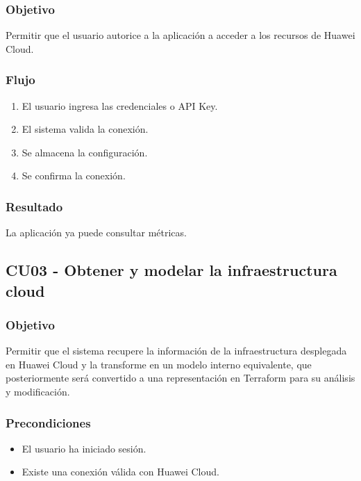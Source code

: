 \subsubsection*{Objetivo}

Permitir que el usuario autorice a la aplicación a acceder a los recursos de Huawei Cloud.

\subsubsection*{Flujo}

\begin{enumerate}
\item El usuario ingresa las credenciales o API Key.
\item El sistema valida la conexión.
\item Se almacena la configuración.
\item Se confirma la conexión.
\end{enumerate}

\subsubsection*{Resultado}

La aplicación ya puede consultar métricas.

\subsection{CU03 - Obtener y modelar la infraestructura cloud}

\subsubsection*{Objetivo}

Permitir que el sistema recupere la información de la infraestructura desplegada en Huawei Cloud y la transforme en un modelo interno equivalente, que posteriormente será convertido a una representación en Terraform para su análisis y modificación.

\subsubsection*{Precondiciones}

\begin{itemize}
\item El usuario ha iniciado sesión.
\item Existe una conexión válida con Huawei Cloud.
\end{itemize}

